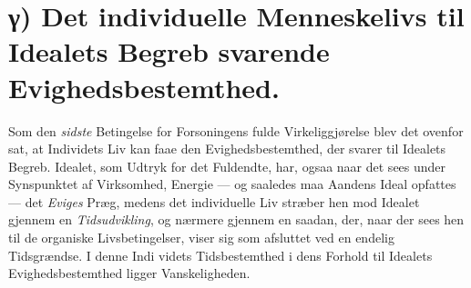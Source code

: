 \section*{γ) Det individuelle Menneskelivs til Idealets Begreb svarende Evighedsbestemthed.}

Som den \emph{sidste} Betingelse for Forsoningens fulde Virkeliggjørelse blev det
ovenfor sat, at Individets Liv kan faae den Evighedsbestemthed, der svarer til
Idealets Begreb. Idealet, som Udtryk for det Fuldendte, har, ogsaa naar det sees
under Synspunktet af Virksomhed, Energie --- og saaledes maa Aandens Ideal
opfattes --- det \emph{Eviges} Præg, medens det individuelle Liv stræber hen mod
Idealet gjennem en \emph{Tidsudvikling}, og nærmere gjennem en saadan, der, naar
der sees hen til de organiske Livsbetingelser, viser sig som afsluttet ved en
endelig Tidsgrændse. I denne Indi\-%
videts Tidsbestemthed i dens Forhold til Idealets Evighedsbestemthed ligger
Vanskeligheden.

